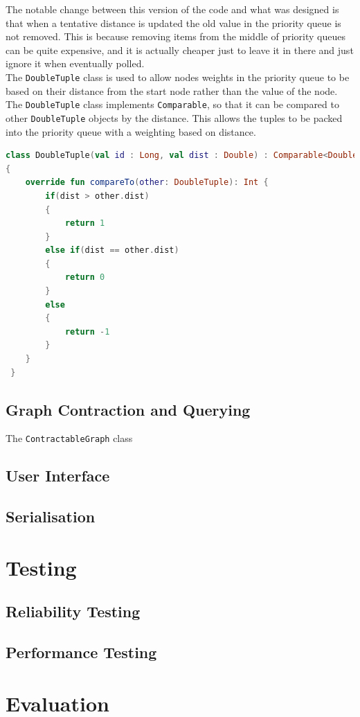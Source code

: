 \documentclass[11pt,twoside,a4paper]{article}
\begin{document}
The notable change between this version of the code and what was designed is that when a tentative distance is updated the old value in the priority queue is not removed. This is because removing items from the middle of priority queues can be quite expensive,
and it is actually cheaper just to leave it in there and just ignore it when eventually polled.\\
The \texttt{DoubleTuple} class is used to allow nodes weights in the priority queue to be based on their distance from the start node rather than the value of the node. The \texttt{DoubleTuple} class implements \texttt{Comparable}, 
so that it can be compared to other \texttt{DoubleTuple} objects by the distance. This allows the tuples to be packed into the priority queue with a weighting based on distance.
\begin{lstlisting}[language=kotlin]
class DoubleTuple(val id : Long, val dist : Double) : Comparable<DoubleTuple>
{
    override fun compareTo(other: DoubleTuple): Int {
        if(dist > other.dist)
        {
            return 1
        }
        else if(dist == other.dist)
        {
            return 0
        }
        else
        {
            return -1
        }
    }
 }
\end{lstlisting}
\subsection{Graph Contraction and Querying}
The \texttt{ContractableGraph} class 
\subsection{User Interface}
\subsection{Serialisation}
\section{Testing}
\subsection{Reliability Testing}
\subsection{Performance Testing}
\section{Evaluation}
\newpage
\printbibliography
\label{end}
\end{document}
